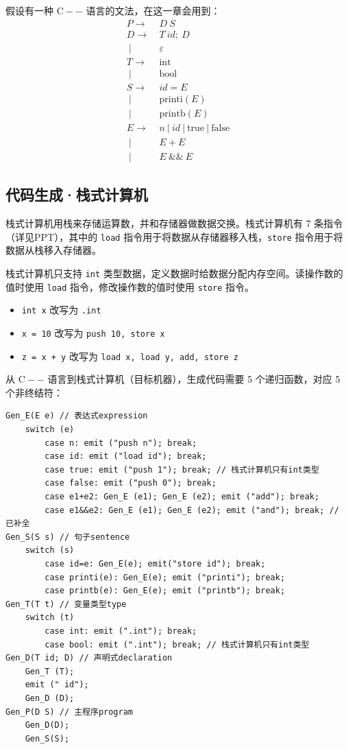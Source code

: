 \documentclass[UTF8]{ctexart}
\newcommand\OR{\ |\ }
\newcommand\Emph[1]{\textcolor{cyan!80!black}{#1}}
\begin{document}
假设有一种 $\mathrm{C--}$ 语言的文法，在这一章会用到：
\begin{equation}\label{eq:C--}
\begin{split}
   P \to\  & D\ S \\
   D \to\  & T\ id;\ D \\
   \OR & \varepsilon \\
   T \to\ & \mathrm{int} \\
   \OR & \mathrm{bool} \\
   S \to\ & id=E \\
   \OR & \mathrm{printi}(E) \\
   \OR & \mathrm{printb}(E) \\
   E \to\ & n \OR id \OR \mathrm{true} \OR \mathrm{false} \\
   \OR & E+E \\
   \OR & E\operatorname{\&\&} E
\end{split}
\end{equation}

\subsection{代码生成·栈式计算机}
\Emph{栈式计算机}用栈来存储运算数，并和存储器做数据交换。栈式计算机有 7 条指令（详见PPT），其中的 \verb!load! 指令用于将数据从存储器移入栈，\verb!store! 指令用于将数据从栈移入存储器。

栈式计算机只支持 \verb!int! 类型数据，定义数据时给数据分配\Emph{内存}空间。读操作数的值时使用 \verb!load! 指令，修改操作数的值时使用 \verb!store! 指令。

\begin{itemize}[itemsep=0pt,parsep=0pt,leftmargin=1.5cm]
  \item \verb!int x! 改写为 \verb!.int!
  \item \verb!x = 10! 改写为 \verb!push 10, store x!
  \item \verb!z = x + y! 改写为 \verb!load x, load y, add, store z!
\end{itemize}

从 $\mathrm{C--}$ 语言到栈式计算机（目标机器），生成代码需要 5 个递归函数，对应 5 个非终结符：
\begin{lstlisting}
Gen_E(E e) // 表达式expression
    switch (e)
        case n: emit ("push n"); break;
        case id: emit ("load id"); break;
        case true: emit ("push 1"); break; // 栈式计算机只有int类型
        case false: emit ("push 0"); break;
        case e1+e2: Gen_E (e1); Gen_E (e2); emit ("add"); break;
        case e1&&e2: Gen_E (e1); Gen_E (e2); emit ("and"); break; // 已补全
Gen_S(S s) // 句子sentence
    switch (s)
        case id=e: Gen_E(e); emit("store id"); break;
        case printi(e): Gen_E(e); emit ("printi"); break;
        case printb(e): Gen_E(e); emit ("printb"); break;
Gen_T(T t) // 变量类型type
    switch (t)
        case int: emit (".int"); break;
        case bool: emit (".int"); break; // 栈式计算机只有int类型
Gen_D(T id; D) // 声明式declaration
    Gen_T (T);
    emit (" id");
    Gen_D (D);
Gen_P(D S) // 主程序program
    Gen_D(D);
    Gen_S(S);
\end{lstlisting}
\end{document}
